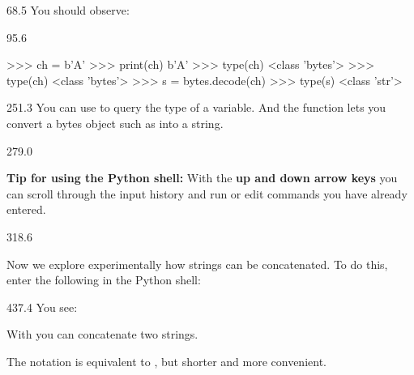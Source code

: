 \documentclass{aslab}
\newcommand*\codex[1]{\fontsize{10bp}{#1bp}\ttfamily\lineskiplimit=-\maxdimen}
\begin{document}
\nextpage
\begin{region}[x=74.7,right=0]{68.5}
You should observe:
\end{region}

\begin{region}[x=74.7,right=0,pitch=14.3]{95.6}
\begin{codeblock}[basicstyle=\codex{14.3}]
>>> ch = b'A'
>>> print(ch)
b'A'
>>> type(ch)
<class 'bytes'>
>>> type(ch)
<class 'bytes'>
>>> s = bytes.decode(ch)
>>> type(s)
<class 'str'>
\end{codeblock}
\end{region}

\begin{region}[x=74.7,right=0,pitch=13.5]{251.3}
You can use  to query the type of a variable. And the
function  lets you convert a bytes object such as
 into a string.
\end{region}

\begin{region}[pitch=13.25]{279.0}
\begin{tasks}[start=4]
\item \textbf{Tip for using the Python shell:} With the \textbf{up and down
  arrow keys} you can scroll through the input history and run or edit
  commands you have already entered.
\end{tasks}
\end{region}

\begin{region}[pitch=13.2]{318.6}
\begin{tasks}[start=5]
\item Now we explore experimentally how strings can be concatenated. To do
  this, enter the following in the Python shell:
  \begin{inputs}
  \item {}
  \item {}
  \item {}
  \item {}
  \item {}
  \item {}
  \end{inputs}
\end{tasks}
\end{region}

\begin{region}[x=74.7,right=0,pitch=13.4]{437.4}
You see:
\begin{dotlist}
\item With \code{+} you can concatenate two strings.
\item The notation  is equivalent to
  , but shorter and more convenient.
\end{dotlist}
\end{region}
\end{document}
